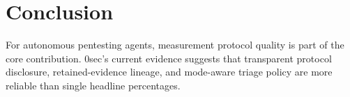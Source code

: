 \documentclass[11pt]{article}
\begin{document}
\section{Conclusion}

For autonomous pentesting agents, measurement protocol quality is part of the
core contribution. 0sec's current evidence suggests that transparent protocol
disclosure, retained-evidence lineage, and mode-aware triage policy are more
reliable than single headline percentages.



\end{document}
